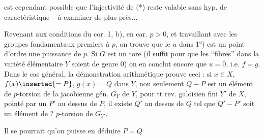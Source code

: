 est cependant possible que l'injectivité de (*) reste valable sans hyp. de caractéristique -- à examiner de plus près...

Revenant aux conditions du cor. 1, b), en car. $p>0$, et travaillant avec les groupes fondamentaux premiers à $p$, on trouve que le $u$ dans 1°) est un point  d'ordre une puissance de $p$. Si $G$ est un tore (il suffit pour  que les ``fibres'' dans la variété élémentaire $Y$ soient de genre 0) on en conclut encore que $u=0$, i.e. $f=g$. Dans le cas général, la démonstration arithmétique prouve  ceci : si $x\in X$,   $f(x)\inserted{=P}$, $g(x)=Q$ dans $Y$, non seulement $Q-P$ est un élément de $p$-torsion de la jacobienne gén. $G_Y$ de $Y$, pour tt rev.  galoisien fini $Y'$ de $X$,  pointé par un $P'$ au dessus de $P$, il existe $Q'$ au dessus de $Q$ tel que $Q'-P'$ soit un élément de ? $p$-torsion de $G_{Y'}$.

Il se pourrait qu'on puisse en déduire $P=Q$

